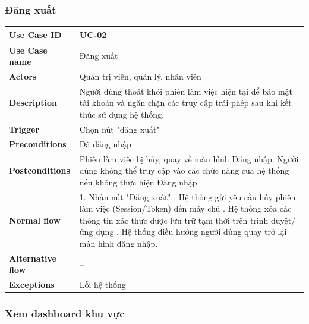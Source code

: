 \subsubsection{Đăng xuất}
\begin{tabular}{|p{3.5cm}|p{9.5cm}|}
\hline
\textbf{Use Case ID} & UC-02 \\
\hline
\textbf{Use Case name} & Đăng xuất \\
\hline
\textbf{Actors} & Quản trị viên, quản lý, nhân viên \\
\hline
\textbf{Description} & Người dùng thoát khỏi phiên làm việc hiện tại để bảo mật tài khoản và ngăn chặn các truy cập trái phép sau khi kết thúc sử dụng hệ thống. \\
\hline
\textbf{Trigger} & Chọn nút "đăng xuất" \\
\hline
\textbf{Preconditions} & Đã đăng nhập \\
\hline
\textbf{Postconditions} & Phiên làm việc bị hủy, quay về màn hình Đăng nhập. Người dùng không thể truy cập vào các chức năng của hệ thống nếu không thực hiện Đăng nhập \\
\hline
\textbf{Normal flow} & 
1. Nhấn nút "Đăng xuất" \newline 2. Hệ thống gửi yêu cầu hủy phiên làm việc (Session/Token) đến máy chủ \newline 3. Hệ thống xóa các thông tin xác thực được lưu trữ tạm thời trên trình duyệt/ứng dụng \newline 4. Hệ thống điều hướng người dùng quay trở lại màn hình đăng nhập. \\

\hline
\textbf{Alternative flow} & -- \\
\hline
\textbf{Exceptions} & Lỗi hệ thống \\
\hline
\end{tabular}

\subsubsection{Xem dashboard khu vực}


